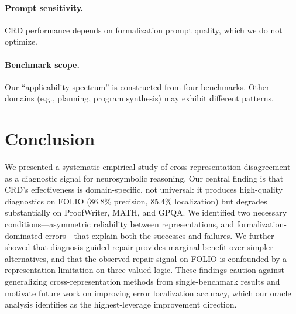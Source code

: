 \documentclass[11pt,a4paper]{article}
\begin{document}
\paragraph{Prompt sensitivity.} CRD performance depends on formalization prompt quality, which we do not optimize.

\paragraph{Benchmark scope.} Our ``applicability spectrum'' is constructed from four benchmarks. Other domains (e.g., planning, program synthesis) may exhibit different patterns.

\section{Conclusion}

We presented a systematic empirical study of cross-representation disagreement as a diagnostic signal for neurosymbolic reasoning. Our central finding is that CRD's effectiveness is domain-specific, not universal: it produces high-quality diagnostics on FOLIO (86.8\% precision, 85.4\% localization) but degrades substantially on ProofWriter, MATH, and GPQA. We identified two necessary conditions---asymmetric reliability between representations, and formalization-dominated errors---that explain both the successes and failures. We further showed that diagnosis-guided repair provides marginal benefit over simpler alternatives, and that the observed repair signal on FOLIO is confounded by a representation limitation on three-valued logic. These findings caution against generalizing cross-representation methods from single-benchmark results and motivate future work on improving error localization accuracy, which our oracle analysis identifies as the highest-leverage improvement direction.
\end{document}
